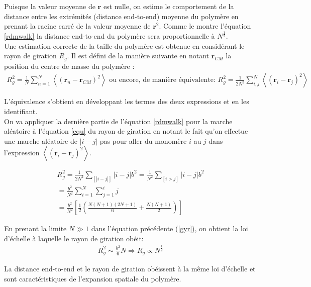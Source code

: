 \documentclass[a4paper,11pt]{article}
\begin{document}
 Puisque la valeur moyenne de $\textbf{r}$ est nulle, on estime le comportement de la distance entre les extrémités (distance end-to-end) moyenne du polymère en prenant la racine carré de la valeur moyenne de $\textbf{r}^2$. Comme le montre l'équation \ref{rdmwalk} la distance end-to-end du polymère sera proportionnelle à $N^\frac{1}{2}$.\\
 
 Une estimation correcte de la taille du polymère est obtenue en considérant le rayon de giration $R_g$. Il est défini de la manière suivante en notant $\textbf{r}_{CM}$ la position du centre de masse du polymère :
 \begin{eqnarray}
R_g^2\text{}=\text{}\frac{1}{N}\sum_{n = 1}^{N} \left<(\textbf{r}_n-\textbf{r}_{CM})^2\right>
 \text{ ou encore, de manière équivalente: }
R_g^2\text{}=\text{}\frac{1}{2N^2}\sum_{i,j}^N \left<(\textbf{r}_i-\textbf{r}_{j})^2\right>
\label{equ}
\end{eqnarray}
 
 L'équivalence s'obtient en développant les termes des deux expressions et en les identifiant.\\


On va appliquer la dernière partie de l'équation \ref{rdmwalk} pour la marche aléatoire à l'équation \ref{equ} du rayon de giration en notant le fait qu'on effectue une marche aléatoire de $|i-j|$ pas pour aller du monomère $i$ au $j$ dans l'expression $\left<(\textbf{r}_i - \textbf{r}_j)^2\right>$.

\begin{gather}
R_g^2\text{}=\text{}\frac{1}{2N^2}\sum_{[|i-j|]} |i-j| b^2=\text{}\frac{1}{N^2}\sum_{[i>j]} |i-j| b^2\nonumber \\
=\text{}\frac{b^2}{N^2} \sum_{i=1}^N \sum_{j=1}^{i} j \\
 = \text{}\frac{b^2}{N^2}[\frac{1}{2}(\frac{N(N+1)(2N+1)}{6}+\frac{N(N+1)}{2})]\nonumber
\label{gyr}
\end{gather}

En prenant la limite $N \gg 1$ dans l'équation précédente (\ref{gyr}), on obtient la loi d'échelle à laquelle le rayon de giration obéit:
\begin{eqnarray}
R_g^2\text{}\sim\text{}\frac{b^2}{6}N \Rightarrow R_g\propto N^{\frac12}
\end{eqnarray}

La distance end-to-end et le rayon de giration obéissent à la même loi d'échelle et sont caractéristiques de l'expansion spatiale du polymère.\\
\end{document}
